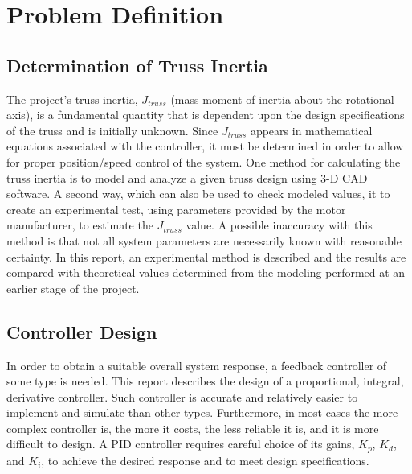 \section{Problem Definition}

\subsection{Determination of Truss Inertia}

The project's truss inertia, $J_{truss}$ (mass moment of inertia about the rotational axis), is a fundamental quantity that is dependent upon the design specifications of the truss and is initially unknown. 
Since  $J_{truss}$ appears in mathematical equations associated with the controller, it must be determined in order to allow for proper position/speed control of the system.
One method for calculating the truss inertia is to model and analyze a given truss design using 3-D CAD software.
A second way, which can also be used to check modeled values, it to create an experimental test, using parameters provided by the motor manufacturer, to estimate the  $J_{truss}$ value. 
A possible inaccuracy with this method is that not all system parameters are necessarily known with reasonable certainty. 
In this report, an experimental method is described and the results are compared with theoretical values determined from the modeling performed at an earlier stage of the project.

\subsection{Controller Design}



In order to obtain a suitable overall system response, a feedback controller of some type is needed.
This report describes the design of a proportional, integral, derivative controller.
Such controller is accurate and relatively easier to implement and simulate than other types. 
Furthermore, in most cases the more complex controller is, the more it costs, the less reliable it is, and it is more difficult to design. 
A PID controller requires careful choice of its gains, $K_p$, $K_d$, and $K_i$, to achieve the desired response and to meet design specifications. 

